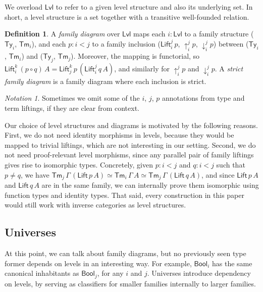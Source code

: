 \documentclass[a4paper,UKenglish,cleveref, autoref, thm-restate]{lipics-v2021}
\theoremstyle{remark}
\newtheorem{notation}{Notation}
\theoremstyle{definition}
\newtheorem{mydefinition}{Definition}
\newcommand{\Ty}{\mathsf{Ty}}
\newcommand{\Tm}{\mathsf{Tm}}
\newcommand{\Bool}{\mathsf{Bool}}
\newcommand{\up}{\uparrow}
\newcommand{\down}{\downarrow}
\newcommand{\Lift}{\mathsf{Lift}}
\newcommand{\Lvl}{\mathsf{Lvl}}
\begin{document}
\noindent We overload $\Lvl$ to refer to a given level structure and also its
underlying set. In short, a level structure is a set together with a transitive
well-founded relation.

\begin{mydefinition}
A \emph{family diagram} over $\Lvl$ maps each $i : \Lvl$ to a family structure
($\Ty_i$, $\Tm_i$), and each $p : i < j$ to a family inclusion
($\Lift_{i}^{j}\,p$, $\up_{i}^{j}p$, $\down_{i}^{j}p$) between ($\Ty_i$,
$\Tm_i$) and ($\Ty_j$, $\Tm_j$). Moreover, the mapping is functorial, so
$\Lift_{i}^{k}\,(p\circ q)\,A = \Lift_{j}^{k}\,p\,(\Lift_{i}^{j}\,q\,A)$, and
similarly for $\up_{i}^{j}p$ and $\down_{i}^{j}p$. A \emph{strict family diagram}
is a family diagram where each inclusion is strict.
\end{mydefinition}

\begin{notation}
Sometimes we omit some of the $i$, $j$, $p$ annotations from type and term
liftings, if they are clear from context.
\end{notation}

Our choice of level structures and diagrams is motivated by the following
reasons. First, we do not need identity morphisms in levels, because they would
be mapped to trivial liftings, which are not interesting in our setting. Second,
we do not need proof-relevant level morphisms, since any parallel pair of family
liftings gives rise to isomorphic types. Concretely, given $p : i < j$ and $q :
i < j$ such that $p \neq q$, we have $\Tm_j\,\Gamma\,(\Lift\,p\,A) \simeq
\Tm_i\,\Gamma\,A \simeq \Tm_j\,\Gamma\,(\Lift\,q\,A)$, and since $\Lift\,p\,A$
and $\Lift\,q\,A$ are in the same family, we can internally prove them
isomorphic using function types and identity types. That said, every construction
in this paper would still work with inverse categories as level structures.

\subsection{Universes}
\label{sec:universes}

At this point, we can talk about family diagrams, but no previously seen type
former depends on levels in an interesting way. For example, $\Bool_i$ has the
same canonical inhabitants as $\Bool_j$, for any $i$ and $j$. Universes
introduce dependency on levels, by serving as classifiers for smaller families internally
to larger families.

\end{document}
